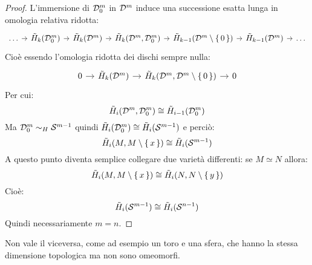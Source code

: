 \begin{proof}
  L'immersione di $ \mathcal{D}^{m}_0 $ in $ \mathcal{D}^{m} $ induce una
  successione esatta lunga in omologia relativa ridotta:
  \[
    \begin{tikzcd}[nodes = {column sep = 7pt}]
      \dots \rar & \tilde{H}_k(\Disk{m}_0) \rar & \tilde{H}_k(\Disk{m}) \rar & \tilde{H}_k(\Disk{m}, \Disk{m}_0) \rar &
      \tilde{H}_{k-1}(\Disk{m} \setminus \set{0}) \rar & \tilde{H}_{k-1}(\Disk{m}) \rar & \dots
    \end{tikzcd}
  \]
  Cioè essendo l'omologia ridotta dei dischi sempre nulla:
  \[
    \begin{tikzcd}[nodes = {column sep = 10pt}]
      0 \rar & \tilde{H}_k(\Disk{m}) \rar & \tilde{H}_k(\Disk{m}, \Disk{m} \setminus \set{0}) \rar &
      0
    \end{tikzcd}
  \]
  Per cui:
  \[
     \tilde{H}_i(\mathcal{D}^{m}, \mathcal{D}^{m}_0) \cong \tilde{H}_{i-1}(\mathcal{D}^{m}_0)
  \]
  Ma $ \mathcal{D}^{m}_0 \sim_H \mathcal{S}^{m-1} $ quindi
  $ \tilde{H}_i(\mathcal{D}^{m}_0) \cong \tilde{H}_i(\mathcal{S}^{m-1}) $
  e perciò:
  \[
    \tilde{H}_i(M, M \setminus \set{x}) \cong \tilde{H}_i(\mathcal{S}^{m-1})
  \]
  A questo punto diventa semplice collegare due varietà differenti: se $ M \simeq N $
  allora:
  \[
    \tilde{H}_i(M, M \setminus \set{x}) \cong \tilde{H}_i(N, N \setminus \set{y})
  \]
  Cioè:
  \[
    \tilde{H}_i(\mathcal{S}^{m-1}) \cong \tilde{H}_i(\mathcal{S}^{n-1})
  \]
  Quindi necessariamente $ m = n $.
\end{proof}
\begin{osservation}
  Non vale il viceversa, come ad esempio un toro e una sfera, che hanno la stessa
  dimensione topologica ma non sono omeomorfi.
\end{osservation}


